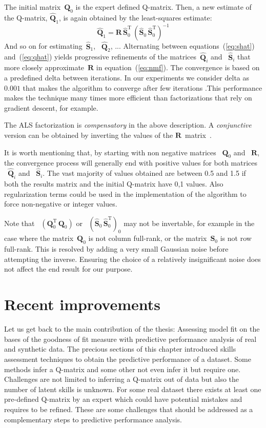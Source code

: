 The initial matrix~$\mathbf{{Q}}_0$ is the expert defined Q-matrix. Then, a new estimate of the Q-matrix, $\mathbf{\hat{Q}}_1$, is again obtained by the least-squares estimate:
\[
  \mathbf{\hat{Q}}_1 = \mathbf{R} \, \mathbf{\hat{S}}_0^{\mathrm{T}} \, (\mathbf{\hat{S}}_0 \, \mathbf{\hat{S}}_0^{\mathrm{T}})^{-1} \label{eq:qhat}
\]
And so on for estimating~$\mathbf{\hat{S}}_1$, ~$\mathbf{\hat{Q}}_2$, ... Alternating between equations~(\ref{eq:shat}) and~(\ref{eq:qhat}) yields progressive refinements of the matrices~$\mathbf{\hat{Q}}_i$ and ~$\mathbf{\hat{S}}_i$ that more closely approximate~$\mathbf{R}$ in equation~(\ref{eq:nmf}).  The convergence is based on a predefined delta between iterations. In our experiments we consider delta as $0.001$ that makes the algorithm to converge after few iterations .This performance makes the technique many times more efficient than factorizations that rely on gradient descent, for example.

The ALS factorization is \textit{compensatory} in the above description.  A \textit{conjunctive} version can be obtained by inverting the values of the $\mathbf{R}$~matrix~\cite{Desmarais2012b}.  

It is worth mentioning that, by starting with non negative matrices ~$\mathbf{{Q}}_0$ and ~$\mathbf{R}$, the convergence process will generally end with positive values for both matrices ~$\mathbf{\hat{Q}}_i$ and ~$\mathbf{\hat{S}}_i$. The vast majority of values obtained are between 0.5 and 1.5 if both the results matrix and the initial Q-matrix have {0,1} values. Also regularization terms could be used in the implementation of the algorithm to force non-negative or integer values.

Note that ~$(\mathbf{Q}_0^{\mathrm{T}} \, \mathbf{Q}_0)$ or ~$(\mathbf{\hat{S}}_0 \,\mathbf{\hat{S}}_0^{\mathrm{T}})_0$ may not be invertable, for example in the case where the matrix~$\mathbf{Q}_0$ is not column full-rank, or the matrix~$\mathbf{S}_0$ is not row full-rank.  This is resolved by adding a very small Gaussian noise before attempting the inverse.  Ensuring the choice of a relatively insignificant noise does not affect the end result for our purpose. 


\section{Recent improvements}

Let us get back to the main contribution of the thesis:  Assessing model fit on the bases of the goodness of fit measure with predictive performance analysis of real and synthetic data. The precious sections of this chapter introduced skills assessment techniques to obtain the predictive performance of a dataset. Some methods infer a Q-matrix and some other not even infer it but require one. Challenges are not limited to inferring a Q-matrix out of data but also the number of latent skills is unknown. For some real dataset there exists at least one pre-defined Q-matrix  by an expert which could have potential mistakes and requires to be refined. These are some challenges that should be addressed as a complementary steps to predictive performance analysis.

